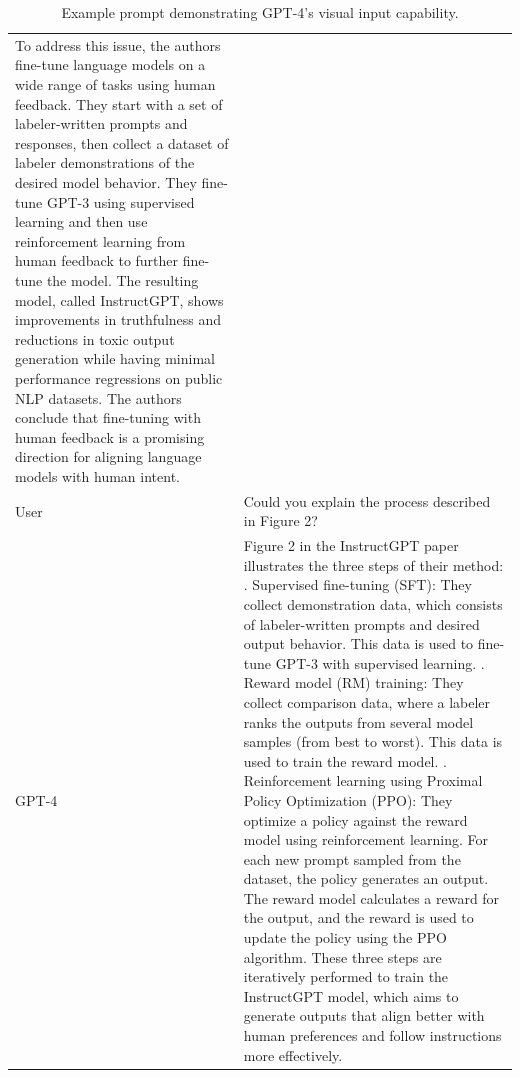 \documentclass{article}
\begin{document}
\begin{table}
\begin{tabular}[]{p{0.5in}p{5in}}
\newline
To address this issue, the authors fine-tune language models on a wide range of tasks using human feedback. They start with a set of labeler-written prompts and responses, then collect a dataset of labeler demonstrations of the desired model behavior. They fine-tune GPT-3 using supervised learning and then use reinforcement learning from human feedback to further fine-tune the model. The resulting model, called InstructGPT, shows improvements in truthfulness and reductions in toxic output generation while having minimal performance regressions on public NLP datasets.\newline
\newline
The authors conclude that fine-tuning with human feedback is a promising direction for aligning language models with human intent.\newline\\
User & Could you explain the process described in Figure 2?\newline \\
GPT-4 & Figure 2 in the InstructGPT paper illustrates the three steps of their method:\newline
\newline
1. Supervised fine-tuning (SFT): They collect demonstration data, which consists of labeler-written prompts and desired output behavior. This data is used to fine-tune GPT-3 with supervised learning.\newline
\newline
2. Reward model (RM) training: They collect comparison data, where a labeler ranks the outputs from several model samples (from best to worst). This data is used to train the reward model.\newline
\newline
3. Reinforcement learning using Proximal Policy Optimization (PPO): They optimize a policy against the reward model using reinforcement learning. For each new prompt sampled from the dataset, the policy generates an output. The reward model calculates a reward for the output, and the reward is used to update the policy using the PPO algorithm.\newline
\newline
These three steps are iteratively performed to train the InstructGPT model, which aims to generate outputs that align better with human preferences and follow instructions more effectively.\\
\bottomrule
\end{tabular}
\caption{Example prompt demonstrating GPT-4's visual input capability.}
\label{table:visual_input_pixel}
\end{table}
\end{document}
